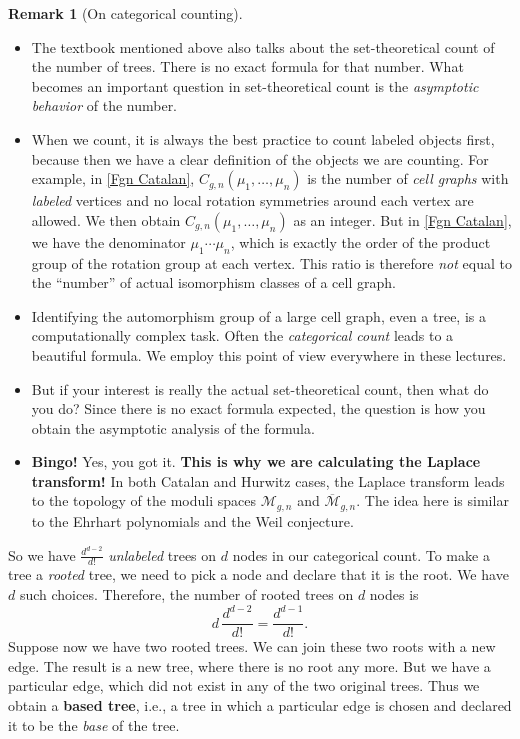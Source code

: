 \documentclass{amsart}
\theoremstyle{definition}
\newtheorem{rem}[thm]{Remark}
\numberwithin{equation}{section}
\numberwithin{figure}{section}
\newcommand{\Mbar}{{\overline{\mathcal{M}}}}
\newcommand{\cM}{{\mathcal{M}}}
\newcommand{\bite}{\begin{itemize}}
\newcommand{\eite}{\end{itemize}}
\begin{document}
\begin{rem}[On categorical counting]
\label{categorical}
\bite
\item
The textbook \cite{Ltext} mentioned above also talks about the set-theoretical count of 
the number of trees. There is no exact formula for that number. 
What becomes an important question in set-theoretical count is the \emph{asymptotic
behavior} of the number. 

\item
When we count,
it is always the best practice to count labeled objects first, because then 
we have a clear definition of the objects we are counting. 
For example, in \eqref{Fgn Catalan}, $C_{g,n}(\mu_1,\dots,\mu_n)$
is the number of \emph{cell graphs} with \emph{labeled}
vertices and no local rotation symmetries around each vertex are allowed.
We then obtain  $C_{g,n}(\mu_1,\dots,\mu_n)$ as an integer. 
But in \eqref{Fgn Catalan}, we have the denominator $\mu_1\cdots\mu_n$,
which is exactly the order of the product group of the rotation group at each vertex. This ratio is therefore \emph{not} equal to the ``number'' of 
actual isomorphism classes of a cell graph. 

\item 
Identifying the automorphism group of a large cell graph, even a tree, 
is a computationally complex task. Often the \emph{categorical count}
leads to a beautiful formula. We employ this point of view
 everywhere in these lectures.

\item
But if your interest is really the actual set-theoretical count, then what do
you do? Since there is no exact formula expected, the question is how you 
obtain the asymptotic analysis of the formula. 
\item \textbf{Bingo!} Yes, you got it. \textbf{This is why we are
calculating the Laplace transform!} 
In both Catalan and Hurwitz cases, the Laplace transform 
leads to the topology of the moduli spaces $\cM_{g,n}$ and $\Mbar_{g,n}$. 
The idea here is similar to the Ehrhart polynomials and the Weil conjecture.
\eite
\end{rem}

So we have $\frac{d^{d-2}}{d!}$ \emph{unlabeled} trees on $d$ nodes
in our categorical count. 
To make a tree a \emph{rooted} tree, we need to pick a node and declare
that it is the root. We have $d$ such choices. Therefore, the number
of rooted trees on $d$ nodes is 
$$
d\, \frac{d^{d-2}}{d!}=\frac{d^{d-1}}{d!}.
$$
Suppose now we have two rooted trees. We can join these two roots
with a new edge. The result is a new tree, where there is no root any more.
But we have a particular edge, which did not exist in any of the two original
trees. Thus we obtain a \textbf{based tree}, i.e., a tree 
in which a particular edge is chosen
and declared it to be the \emph{base} of the tree.
\end{document}
